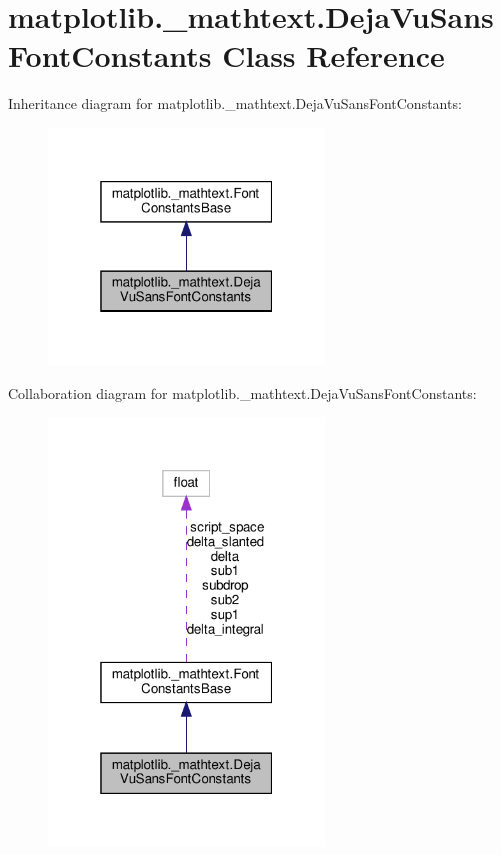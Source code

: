 \hypertarget{classmatplotlib_1_1__mathtext_1_1DejaVuSansFontConstants}{}\section{matplotlib.\+\_\+mathtext.\+Deja\+Vu\+Sans\+Font\+Constants Class Reference}
\label{classmatplotlib_1_1__mathtext_1_1DejaVuSansFontConstants}


Inheritance diagram for matplotlib.\+\_\+mathtext.\+Deja\+Vu\+Sans\+Font\+Constants\+:
\nopagebreak
\begin{figure}[H]
\begin{center}
\leavevmode
\includegraphics[width=208pt]{classmatplotlib_1_1__mathtext_1_1DejaVuSansFontConstants__inherit__graph}
\end{center}
\end{figure}


Collaboration diagram for matplotlib.\+\_\+mathtext.\+Deja\+Vu\+Sans\+Font\+Constants\+:
\nopagebreak
\begin{figure}[H]
\begin{center}
\leavevmode
\includegraphics[width=208pt]{classmatplotlib_1_1__mathtext_1_1DejaVuSansFontConstants__coll__graph}
\end{center}
\end{figure}
